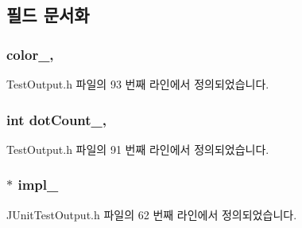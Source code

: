\subsection{필드 문서화}
\subsubsection[{\texorpdfstring{color\+\_\+}{color_}}]{ color\+\_\+\hspace{0.3cm}{\ttfamily [protected]}, {\ttfamily [inherited]}}\hypertarget{class_test_output_adda8c1875964c3b80ed1c77b585fc756}{}\label{class_test_output_adda8c1875964c3b80ed1c77b585fc756}


Test\+Output.\+h 파일의 93 번째 라인에서 정의되었습니다.

\subsubsection[{\texorpdfstring{dot\+Count\+\_\+}{dotCount_}}]{\setlength{\rightskip}{0pt plus 5cm}int dot\+Count\+\_\+\hspace{0.3cm}{\ttfamily [protected]}, {\ttfamily [inherited]}}\hypertarget{class_test_output_a3c1c7e8cf0310d384198f0dc504251c6}{}\label{class_test_output_a3c1c7e8cf0310d384198f0dc504251c6}


Test\+Output.\+h 파일의 91 번째 라인에서 정의되었습니다.

\subsubsection[{\texorpdfstring{impl\+\_\+}{impl_}}]{$\ast$ impl\+\_\+\hspace{0.3cm}{\ttfamily [protected]}}\hypertarget{class_j_unit_test_output_a123a6133cd44cdaa2c63a519f9fb56f4}{}\label{class_j_unit_test_output_a123a6133cd44cdaa2c63a519f9fb56f4}


J\+Unit\+Test\+Output.\+h 파일의 62 번째 라인에서 정의되었습니다.

